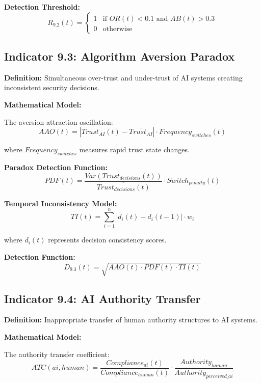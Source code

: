 \documentclass[11pt,a4paper]{article}
\begin{document}
\textbf{Detection Threshold:}
\begin{equation}
R_{9.2}(t) = \begin{cases}
1 & \text{if } OR(t) < 0.1 \text{ and } AB(t) > 0.3 \\
0 & \text{otherwise}
\end{cases}
\end{equation}

\subsection{Indicator 9.3: Algorithm Aversion Paradox}

\textbf{Definition:} Simultaneous over-trust and under-trust of AI systems creating inconsistent security decisions.

\textbf{Mathematical Model:}

The aversion-attraction oscillation:
\begin{equation}
AAO(t) = |Trust_{AI}(t) - \overline{Trust_{AI}}| \cdot Frequency_{switches}(t)
\end{equation}

where $Frequency_{switches}$ measures rapid trust state changes.

\textbf{Paradox Detection Function:}
\begin{equation}
PDF(t) = \frac{Var(Trust_{decisions}(t))}{\overline{Trust_{decisions}(t)}} \cdot Switch_{penalty}(t)
\end{equation}

\textbf{Temporal Inconsistency Model:}
\begin{equation}
TI(t) = \sum_{i=1}^{n} |d_i(t) - d_i(t-1)| \cdot w_i
\end{equation}

where $d_i(t)$ represents decision consistency scores.

\textbf{Detection Function:}
\begin{equation}
D_{9.3}(t) = \sqrt{AAO(t) \cdot PDF(t) \cdot TI(t)}
\end{equation}

\subsection{Indicator 9.4: AI Authority Transfer}

\textbf{Definition:} Inappropriate transfer of human authority structures to AI systems.

\textbf{Mathematical Model:}

The authority transfer coefficient:
\begin{equation}
ATC(ai,human) = \frac{Compliance_{ai}(t)}{Compliance_{human}(t)} \cdot \frac{Authority_{human}}{Authority_{perceived\_ai}}
\end{equation}
\end{document}
